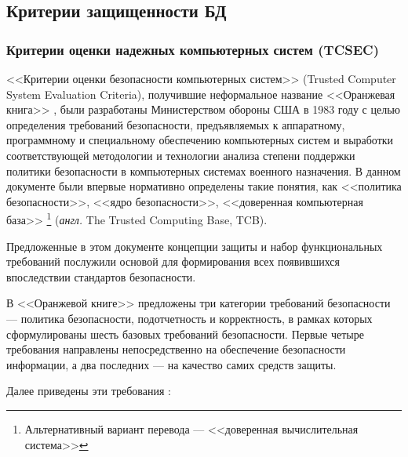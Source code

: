 \subsection{Критерии защищенности БД}

\subsubsection{Критерии оценки надежных компьютерных систем (TCSEC)}
<<Критерии оценки безопасности компьютерных систем>> (Trusted Computer System Evaluation Criteria),
получившие неформальное название <<Оранжевая книга>> \cite{OrangeBook}, были разработаны Министерством обороны
США в 1983 году с целью определения требований безопасности, предъявляемых к аппаратному,
программному и специальному обеспечению компьютерных систем и выработки соответствующей
методологии и технологии анализа степени поддержки политики безопасности в компьютерных
системах военного назначения. В данном документе были впервые нормативно определены такие
понятия, как <<политика безопасности>>, <<ядро безопасности>>, <<доверенная компьютерная база>>
\footnote [1]{ Альтернативный вариант перевода --- <<доверенная вычислительная система>> } (\textit{англ.} The Trusted Computing Base, TCB).

Предложенные в этом документе концепции защиты и набор функциональных требований послужили
основой для формирования всех появившихся впоследствии стандартов безопасности.

В <<Оранжевой книге>> предложены три категории требований безопасности --- политика безопасности,
подотчетность и корректность, в рамках которых сформулированы шесть базовых требований безопасности.
Первые четыре требования направлены непосредственно на обеспечение безопасности информации,
а два последних --- на качество самих средств защиты.

Далее приведены эти требования \cite{OrangeBook}:

